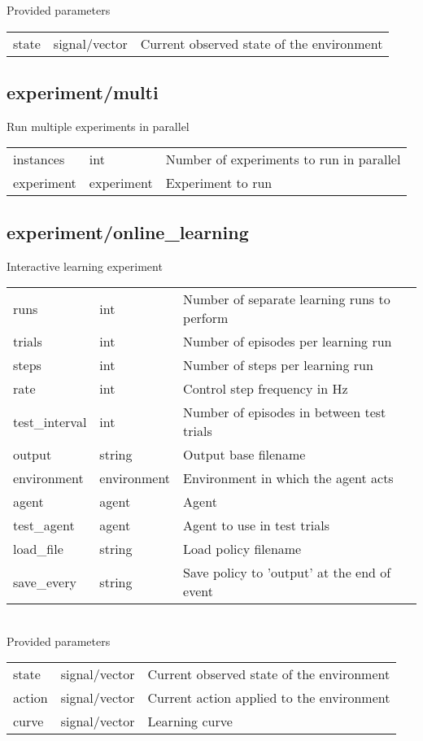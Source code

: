 \noindent Provided parameters\\

\noindent\begin{tabular}{@{}lll@{}}
state&signal/vector&Current observed state of the environment\\
\end{tabular}
\subsection{experiment/multi}
\noindent Run multiple experiments in parallel\\

\noindent\begin{tabular}{@{}lll@{}}
instances&int&Number of experiments to run in parallel\\
experiment&experiment&Experiment to run\\
\end{tabular}
\subsection{experiment/online\_learning}
\noindent Interactive learning experiment\\

\noindent\begin{tabular}{@{}lll@{}}
runs&int&Number of separate learning runs to perform\\
trials&int&Number of episodes per learning run\\
steps&int&Number of steps per learning run\\
rate&int&Control step frequency in Hz\\
test\_interval&int&Number of episodes in between test trials\\
output&string&Output base filename\\
environment&environment&Environment in which the agent acts\\
agent&agent&Agent\\
test\_agent&agent&Agent to use in test trials\\
load\_file&string&Load policy filename\\
save\_every&string&Save policy to 'output' at the end of event\\
\end{tabular}
\\

\noindent Provided parameters\\

\noindent\begin{tabular}{@{}lll@{}}
state&signal/vector&Current observed state of the environment\\
action&signal/vector&Current action applied to the environment\\
curve&signal/vector&Learning curve\\
\end{tabular}
